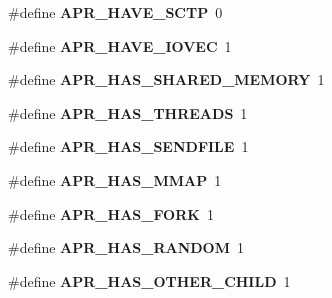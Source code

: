 \begin{DoxyCompactItemize}
\item 
\#define {\bfseries A\+P\+R\+\_\+\+H\+A\+V\+E\+\_\+\+S\+C\+TP}~0\hypertarget{group__apr__platform_ga06b60866b89f9881de1022d193a7f126}{}\label{group__apr__platform_ga06b60866b89f9881de1022d193a7f126}

\item 
\#define {\bfseries A\+P\+R\+\_\+\+H\+A\+V\+E\+\_\+\+I\+O\+V\+EC}~1\hypertarget{group__apr__platform_gafb25c8af133971c391c18193e67a5f4f}{}\label{group__apr__platform_gafb25c8af133971c391c18193e67a5f4f}

\item 
\#define {\bfseries A\+P\+R\+\_\+\+H\+A\+S\+\_\+\+S\+H\+A\+R\+E\+D\+\_\+\+M\+E\+M\+O\+RY}~1\hypertarget{group__apr__platform_ga88684cc5f8a23bc2cd6a4b63e5943e05}{}\label{group__apr__platform_ga88684cc5f8a23bc2cd6a4b63e5943e05}

\item 
\#define {\bfseries A\+P\+R\+\_\+\+H\+A\+S\+\_\+\+T\+H\+R\+E\+A\+DS}~1\hypertarget{group__apr__platform_ga8f98cbf61cd2ac1fada71fe486b04a34}{}\label{group__apr__platform_ga8f98cbf61cd2ac1fada71fe486b04a34}

\item 
\#define {\bfseries A\+P\+R\+\_\+\+H\+A\+S\+\_\+\+S\+E\+N\+D\+F\+I\+LE}~1\hypertarget{group__apr__platform_ga653f9e26ef4064c7daaad1bb126b5d1f}{}\label{group__apr__platform_ga653f9e26ef4064c7daaad1bb126b5d1f}

\item 
\#define {\bfseries A\+P\+R\+\_\+\+H\+A\+S\+\_\+\+M\+M\+AP}~1\hypertarget{group__apr__platform_ga4f63ee64cebd015823f922c7ff98eadf}{}\label{group__apr__platform_ga4f63ee64cebd015823f922c7ff98eadf}

\item 
\#define {\bfseries A\+P\+R\+\_\+\+H\+A\+S\+\_\+\+F\+O\+RK}~1\hypertarget{group__apr__platform_ga3261ef06837fa5dc1a0164f7b0f16fab}{}\label{group__apr__platform_ga3261ef06837fa5dc1a0164f7b0f16fab}

\item 
\#define {\bfseries A\+P\+R\+\_\+\+H\+A\+S\+\_\+\+R\+A\+N\+D\+OM}~1\hypertarget{group__apr__platform_ga1a277e1905ab841d2979eff95816f8fb}{}\label{group__apr__platform_ga1a277e1905ab841d2979eff95816f8fb}

\item 
\#define {\bfseries A\+P\+R\+\_\+\+H\+A\+S\+\_\+\+O\+T\+H\+E\+R\+\_\+\+C\+H\+I\+LD}~1\hypertarget{group__apr__platform_ga082384ec95907197e41f546570e06a69}{}\label{group__apr__platform_ga082384ec95907197e41f546570e06a69}


\end{DoxyCompactItemize}
